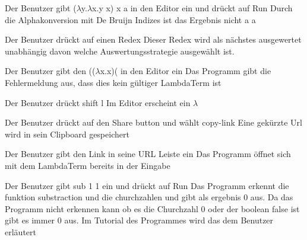 \documentclass[parskip=full,11pt,twoside]{scrartcl}
\begin{document}
{ Der Benutzer gibt ($\lambda$y.$\lambda$x.y x) x a in den Editor ein und drückt auf Run}
{ Durch die Alphakonversion mit De Bruijn Indizes ist das Ergebnis nicht a  a  }

 { Der Benutzer drückt auf einen Redex}
{ Dieser Redex wird als nächstes ausgewertet unabhängig davon welche Auswertungsstrategie ausgewählt ist. }

{ Der Benutzer gibt den (($\lambda$x.x)( in den Editor ein }
{ Das Programm gibt die Fehlermeldung aus, dass dies kein gültiger LambdaTerm ist }

{ Der Benutzer drückt shift l }
{Im Editor erscheint ein $\lambda$}

{ Der Benutzer drückt auf den Share button und wählt copy-link}
{ Eine gekürzte Url wird in sein Clipboard gespeichert }

{Der Benutzer gibt den Link in seine URL Leiste ein }
{ Das Programm öffnet sich mit dem LambdaTerm bereits in der Eingabe }

{ Der Benutzer gibt sub 1 1 ein und drückt auf Run }
{ Das Programm erkennt die funktion substraction und die churchzahlen und gibt als ergebnis 0 aus. Da das Programm nicht erkennen kann ob es die Churchzahl 0 oder der boolean false ist gibt es immer 0 aus. Im Tutorial des Programmes wird das dem Benutzer erläutert }





\end{document}
